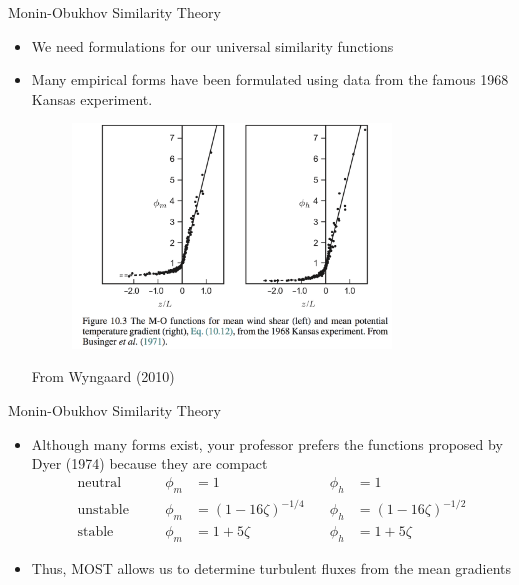 \begin{frame}{Monin-Obukhov Similarity Theory}
	\begin{itemize}
		\item We need formulations for our universal similarity functions
		\item Many empirical forms have been formulated using data from the famous 1968 Kansas experiment.
		\begin{figure}
		\includegraphics[width=0.8\textwidth]{mo1}	
		\end{figure}
		\tiny \centering From Wyngaard (2010)
	\end{itemize}
\end{frame}
\begin{frame}{Monin-Obukhov Similarity Theory}
	\begin{itemize}
		\item Although many forms exist, your professor prefers the functions proposed by Dyer (1974) because they are compact
		\begin{align*}
		\text{neutral} & \quad & \phi_m &= 1 & \quad  \phi_h &= 1\\
		\text{unstable} & \quad & \phi_m &= \left(1 - 16\zeta\right)^{-1/4} & \quad  \phi_h &= \left(1 - 16\zeta\right)^{-1/2}\\
		\text{stable} & \quad & \phi_m &= 1 + 5\zeta & \quad  \phi_h &= 1 + 5\zeta
		\end{align*}
	\item Thus, MOST allows us to determine turbulent fluxes from the mean gradients
	\end{itemize}
\end{frame}



